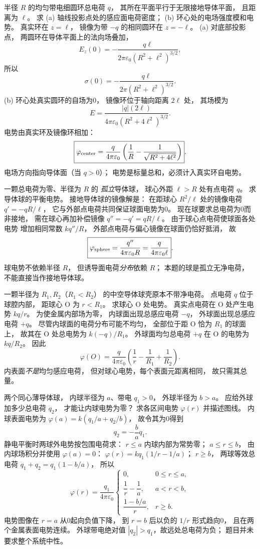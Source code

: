 半径 $R$ 的均匀带电细圆环总电荷 $q$，
其所在平面平行于无限接地导体平面，
且距离为 $\ell$。
求 (a) 轴线投影点处的感应面电荷密度；
(b) 环心处的电场强度模和电势。
\exsolution
真实环在 $z=\ell$，
镜像为带 $-q$ 的相同圆环在 $z=-\ell$。
(a) 对底部投影点，
两圆环在导体平面上的法向场叠加，
\[
E_z(0)=
-\frac{q\ell}{2\pi\varepsilon_0(R^2+\ell^2)^{3/2}},
\]
所以
\[
\boxed{\sigma(0)=
-\frac{q\ell}{2\pi(R^2+\ell^2)^{3/2}}}.
\]
(b) 环心处真实圆环的自场为0，
镜像环位于轴向距离 $2\ell$ 处，
其场模为
\[
\boxed{E=
\frac{|q|(2\ell)}
{4\pi\varepsilon_0(R^2+4\ell^2)^{3/2}}}.
\]
电势由真实环及镜像环相加：
\[
\boxed{\varphi_{\rm center}=
\frac q{4\pi\varepsilon_0}
\left(\frac1R-\frac1{\sqrt{R^2+4\ell^2}}\right)}.
\]
\excheck 电场方向指向导体面（当 $q>0$）；
电势是标量总和，必须计入真实环自电势。

一颗总电荷为零、半径为 $R$ 的
\emph{孤立}导体球，
球心外距 $\ell>R$ 处有点电荷 $q$。
求导体球的平衡电势。
\exsolution
接地导体球的镜像解是：
在距球心 $R^2/\ell$ 处的镜像电荷
$q'=-qR/\ell$，
它与外部点电荷共同保证球面电势为0。
现在球要求总电荷为0而非接地，
需在球心再加补偿镜像
$q''=-q'=qR/\ell$。
由于球心点电荷使球面各处电势
增加相同常数
$kq''/R$，
外部点电荷与偏心镜像在球面仍恰好抵消，
故
\[
\boxed{\varphi_{\rm sphere}
=\frac{q''}{4\pi\varepsilon_0R}
=\frac{q}{4\pi\varepsilon_0\ell}}.
\]
\excheck 球电势不依赖半径 $R$，
但诱导面电荷\emph{分布}依赖 $R$；
本题的球是孤立无净电荷，
不能直接当作接地导体球。

一颗半径为 $R_1,R_2$（$R_1<R_2$）
的中空导体球壳原本不带净电荷。
点电荷 $q$ 位于球腔内部，
距球心 O 为 $r<R_1$。
求球心 O 处电势。
\exsolution
真实点电荷在 O 处产生电势 $kq/r$。
为使金属内部场为零，
内球面出现总感应电荷 $-q$，
外球面出现总感应电荷 $+q$。
尽管内球面的电荷分布可能不均匀，
全部位于距 O 恰为 $R_1$ 的球面上，
故其在 O 处总电势为
$k(-q)/R_1$。
外球面均匀总电荷 $+q$ 在 O 的电势为
$kq/R_2$。
因此
\[
\boxed{\varphi(O)=
\frac q{4\pi\varepsilon_0}
\left(\frac1r-\frac1{R_1}+\frac1{R_2}\right)}.
\]
\excheck 内表面\emph{不是}均匀感应电荷，
但对球心电势，每个表面元距离相同，
故只需其总量。

两个同心薄导体球，
内球半径为 $a$、带电 $q_1>0$，
外球半径为 $b>a$。
应给外球加多少总电荷 $q_2$，
才能让内球电势为零？
求各区间电势 $\varphi(r)$ 并描述图线。
\exsolution
内球表面电势为
$\varphi(a)=k(q_1/a+q_2/b)$，
故令其为0得到
\[
\boxed{q_2=-\frac ba q_1}.
\]
静电平衡时两球外电势按包围电荷求：
$r\le a$ 内球内部为常势零；
$a\le r\le b$，
由内球场积分并使用 $\varphi(a)=0$：
$\varphi(r)=kq_1(1/r-1/a)$；
$r\ge b$，
两球等效总电荷
$q_1+q_2=q_1(1-b/a)$，
所以
\[
\boxed{\varphi(r)=\frac{q_1}{4\pi\varepsilon_0}
\begin{cases}
0,&0\le r\le a,\\
\dfrac1r-\dfrac1a,&a<r<b,\\
\dfrac{1-b/a}{r},&r\ge b.
\end{cases}}
\]
电势图像在 $r=a$ 从0起向负值下降，
到 $r=b$ 后以负的 $1/r$ 形式趋向0，
且在两个金属表面电势连续。
\excheck 外球带电绝对值
$|q_2|>q_1$，故远处总电荷为负；
题目并未要求整个系统中性。
